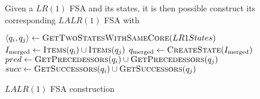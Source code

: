 \begin{definition}
    Given a $LR(1)$ FSA and its states, it is then possible construct its corresponding $LALR(1)$ FSA with
    \begin{algorithm}[H]
        \begin{algorithmic}[1]
                \Repeat
                    \State $\langle q_i, q_j \rangle \gets \Call{GetTwoStatesWithSameCore}{LR1States}$
                    \State $I_{\text{merged}} \gets \Call{Items}{q_i} \cup \Call{Items}{q_j}$
                    \State $q_{\text{merged}} \gets \Call{CreateState}{I_{\text{merged}}}$
                    \State $pred \gets \Call{GetPrecedessors}{q_i} \cup \Call{GetPrecedessors}{q_j}$
                        \State {}
                    \EndFor
                    \State $succ \gets \Call{GetSuccessors}{q_i} \cup \Call{GetSuccessors}{q_j}$
                        \State {}
                    \EndFor
            \EndProcedure
        \end{algorithmic}
        \caption{$LALR(1)$ FSA construction}
        \label{prog:lalr1-fsa}
    \end{algorithm}
    

\end{definition}

